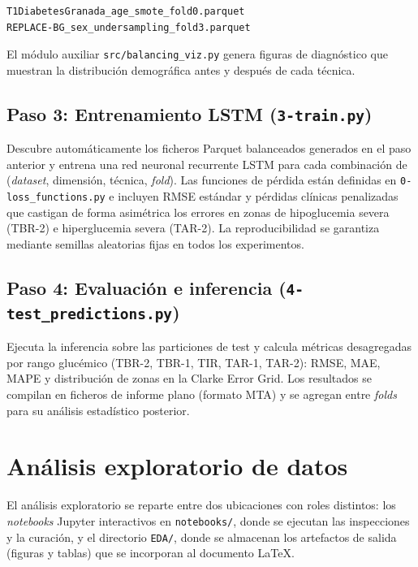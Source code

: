 \begin{verbatim}
T1DiabetesGranada_age_smote_fold0.parquet
REPLACE-BG_sex_undersampling_fold3.parquet
\end{verbatim}

El módulo auxiliar \texttt{src/balancing\_viz.py} genera figuras de
diagnóstico que muestran la distribución demográfica antes y después de
cada técnica.

\subsection{Paso 3: Entrenamiento LSTM (\texttt{3-train.py})}
\label{subsec:anexo_entrenamiento}

Descubre automáticamente los ficheros Parquet balanceados generados en
el paso anterior y entrena una red neuronal recurrente LSTM para cada
combinación de (\textit{dataset}, dimensión, técnica, \textit{fold}).
Las funciones de pérdida están definidas en \texttt{0-loss\_functions.py}
e incluyen RMSE estándar y pérdidas clínicas penalizadas que castigan de
forma asimétrica los errores en zonas de hipoglucemia severa (TBR-2) e
hiperglucemia severa (TAR-2). La reproducibilidad se garantiza mediante
semillas aleatorias fijas en todos los experimentos.

\subsection{Paso 4: Evaluación e inferencia
            (\texttt{4-test\_predictions.py})}
\label{subsec:anexo_evaluacion}

Ejecuta la inferencia sobre las particiones de test y calcula métricas
desagregadas por rango glucémico (TBR-2, TBR-1, TIR, TAR-1, TAR-2):
RMSE, MAE, MAPE y distribución de zonas en la Clarke Error Grid. Los
resultados se compilan en ficheros de informe plano (formato MTA) y se
agregan entre \textit{folds} para su análisis estadístico posterior.

\section{Análisis exploratorio de datos}
\label{sec:anexo_eda}

El análisis exploratorio se reparte entre dos ubicaciones con roles
distintos: los \textit{notebooks} Jupyter interactivos en
\texttt{notebooks/}, donde se ejecutan las inspecciones y la curación, y
el directorio \texttt{EDA/}, donde se almacenan los artefactos de salida
(figuras y tablas) que se incorporan al documento \LaTeX.

